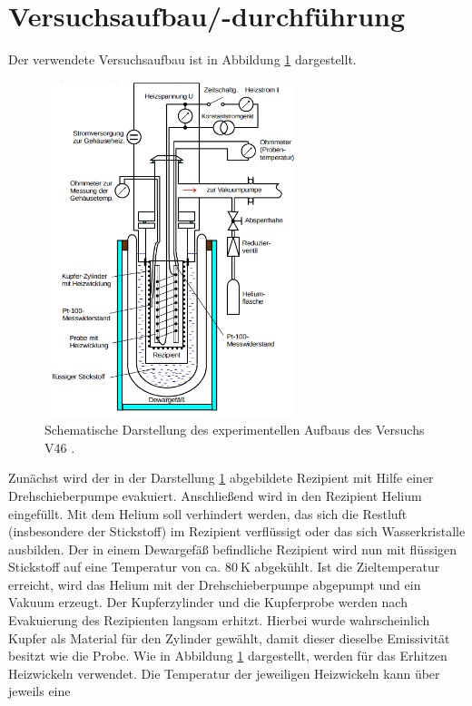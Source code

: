 \section{Versuchsaufbau/-durchführung}
Der verwendete Versuchsaufbau ist in Abbildung \ref{fig: aufbau} dargestellt.
\begin{figure}
  \centering
  \includegraphics[width = 0.65\textwidth]{./content/images/aufbau.png}
  \caption{Schematische Darstellung des experimentellen Aufbaus des Versuchs V46  \cite{anleitungV47}.}
  \label{fig: aufbau}
\end{figure}
Zunächst wird der in der Darstellung \ref{fig: aufbau} abgebildete Rezipient
mit Hilfe einer Drehschieberpumpe evakuiert. Anschließend wird in den Rezipient
Helium eingefüllt. Mit dem Helium soll verhindert werden, das sich die Restluft
(insbesondere der Stickstoff) im Rezipient verflüssigt oder das sich Wasserkristalle
ausbilden. Der in einem Dewargefäß befindliche Rezipient wird nun mit flüssigen
Stickstoff auf eine Temperatur von ca. $\SI{80}{\kelvin}$ abgekühlt. Ist die
Zieltemperatur erreicht, wird das Helium mit der Drehschieberpumpe abgepumpt und
ein Vakuum erzeugt. Der Kupferzylinder und die Kupferprobe werden nach Evakuierung
des Rezipienten langsam erhitzt. Hierbei wurde wahrscheinlich Kupfer als Material
für den Zylinder gewählt, damit dieser dieselbe Emissivität besitzt
wie die Probe. Wie in Abbildung \ref{fig: aufbau} dargestellt, werden für das Erhitzen
Heizwickeln verwendet. Die Temperatur der jeweiligen Heizwickeln kann über jeweils eine
